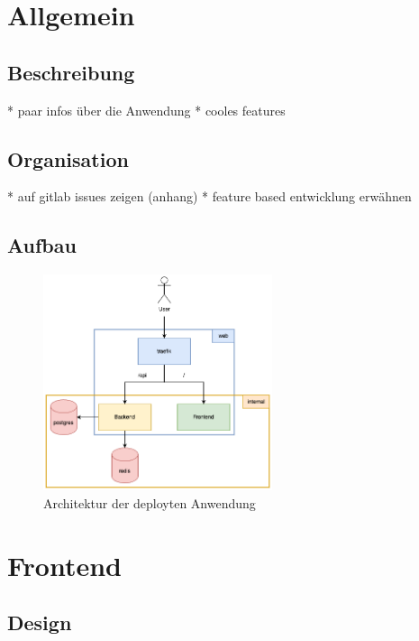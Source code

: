 \documentclass[a4paper, 12pt]{article}
\begin{document}
\newpage
    \section{Allgemein}
    \subsection{Beschreibung}
    * paar infos über die Anwendung
    * cooles features

    \subsection{Organisation}
    * auf gitlab issues zeigen (anhang)
    * feature based entwicklung erwähnen

    \subsection{Aufbau}

    \begin{figure}[H]
        \center\includegraphics[width=0.6\textwidth]{../images/architecture.drawio}
        \caption{Architektur der deployten Anwendung}\label{fig:figure}
    \end{figure}

    \section{Frontend}
    \subsection{Design}
\end{document}
